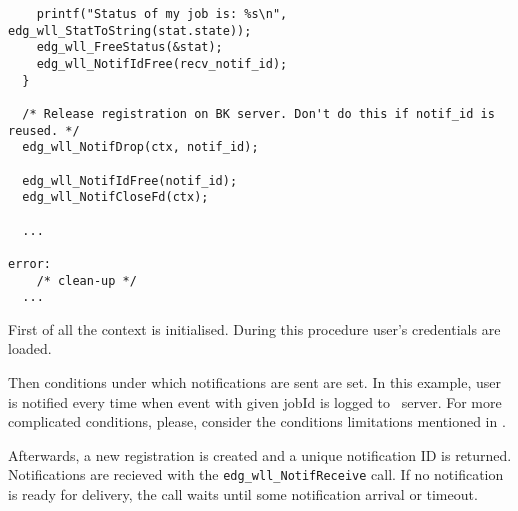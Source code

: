 \begin{verbatim}
    printf("Status of my job is: %s\n", edg_wll_StatToString(stat.state));
    edg_wll_FreeStatus(&stat);
    edg_wll_NotifIdFree(recv_notif_id);
  }

  /* Release registration on BK server. Don't do this if notif_id is reused. */
  edg_wll_NotifDrop(ctx, notif_id);

  edg_wll_NotifIdFree(notif_id);
  edg_wll_NotifCloseFd(ctx);
	
  ...

error:
	/* clean-up */
  ...

\end{verbatim}

First of all the context is initialised. During this procedure user's credentials are loaded. %

Then conditions under which notifications are sent are set. In this example, user is notified every time when event with given jobId is logged to \LB\ server. For more complicated conditions, please, consider the conditions limitations mentioned in \cite{lbug}.

Afterwards, a new registration is created and a unique notification ID is
returned.
Notifications are recieved with the \verb'edg_wll_NotifReceive' call.
If no notification is ready for
delivery, the call waits until some notification arrival or timeout.


